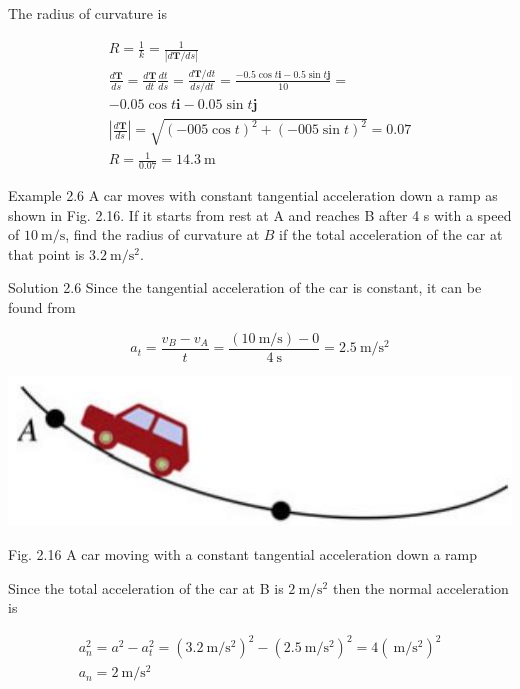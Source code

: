 \documentclass[10pt]{article}
\begin{document}
The radius of curvature is

$$
\begin{gathered}
R=\frac{1}{k}=\frac{1}{|d \mathbf{T} / d s|} \\
\frac{d \mathbf{T}}{d s}=\frac{d \mathbf{T}}{d t} \frac{d t}{d s}=\frac{d \mathbf{T} / d t}{d s / d t}=\frac{-0.5 \cos t \mathbf{i}-0.5 \sin t \mathbf{j}}{10}= \\
-0.05 \cos t \mathbf{i}-0.05 \sin t \mathbf{j} \\
\left|\frac{d \mathbf{T}}{d s}\right|=\sqrt{(-005 \cos t)^{2}+(-005 \sin t)^{2}}=0.07 \\
R=\frac{1}{0.07}=14.3 \mathrm{~m}
\end{gathered}
$$

Example 2.6 A car moves with constant tangential acceleration down a ramp as shown in Fig. 2.16. If it starts from rest at A and reaches B after 4 s with a speed of $10 \mathrm{~m} / \mathrm{s}$, find the radius of curvature at $B$ if the total acceleration of the car at that point is $3.2 \mathrm{~m} / \mathrm{s}^{2}$.

Solution 2.6 Since the tangential acceleration of the car is constant, it can be found from

$$
a_{t}=\frac{v_{B}-v_{A}}{t}=\frac{(10 \mathrm{~m} / \mathrm{s})-0}{4 \mathrm{~s}}=2.5 \mathrm{~m} / \mathrm{s}^{2}
$$

\begin{center}
\includegraphics[max width=\textwidth]{2024_09_13_db1f357d2aad0a03eb2eg-033}
\end{center}

Fig. 2.16 A car moving with a constant tangential acceleration down a ramp

Since the total acceleration of the car at B is $2 \mathrm{~m} / \mathrm{s}^{2}$ then the normal acceleration is

$$
\begin{gathered}
a_{n}^{2}=a^{2}-a_{t}^{2}=\left(3.2 \mathrm{~m} / \mathrm{s}^{2}\right)^{2}-\left(2.5 \mathrm{~m} / \mathrm{s}^{2}\right)^{2}=4\left(\mathrm{~m} / \mathrm{s}^{2}\right)^{2} \\
a_{n}=2 \mathrm{~m} / \mathrm{s}^{2}
\end{gathered}
$$
\end{document}
